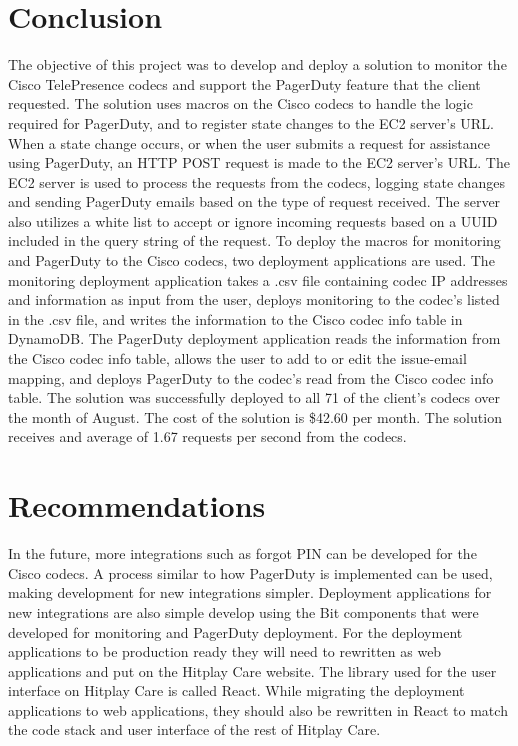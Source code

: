 \documentclass[letterpaper,12pt]{article}
\begin{document}
\section{Conclusion}
The objective of this project was to develop and deploy a solution to monitor the Cisco TelePresence codecs and support the PagerDuty feature that the client requested. The solution uses macros on the Cisco codecs to handle the logic required for PagerDuty, and to register state changes to the EC2 server's URL. When a state change occurs, or when the user submits a request for assistance using PagerDuty, an HTTP POST request is made to the EC2 server's URL. The EC2 server is used to process the requests from the codecs, logging state changes and sending PagerDuty emails based on the type of request received. The server also utilizes a white list to accept or ignore incoming requests based on a UUID included in the query string of the request. To deploy the macros for monitoring and PagerDuty to the Cisco codecs, two deployment applications are used. The monitoring deployment application takes a .csv file containing codec IP addresses and information as input from the user, deploys monitoring to the codec's listed in the .csv file, and writes the information to the Cisco codec info table in DynamoDB. The PagerDuty deployment application reads the information from the Cisco codec info table, allows the user to add to or edit the issue-email mapping, and deploys PagerDuty to the codec's read from the Cisco codec info table. The solution was successfully deployed to all 71 of the client's codecs over the month of August. The cost of the solution is \$42.60 per month. The solution receives and average of 1.67 requests per second from the codecs.

\section{Recommendations}
In the future, more integrations such as forgot PIN can be developed for the Cisco codecs. A process similar to how PagerDuty is implemented can be used, making development for new integrations simpler. Deployment applications for new integrations are also simple develop using the Bit components that were developed for monitoring and PagerDuty deployment. For the deployment applications to be production ready they will need to rewritten as web applications and put on the Hitplay Care website. The library used for the user interface on Hitplay Care is called React. While migrating the deployment applications to web applications, they should also be rewritten in React to match the code stack and user interface of the rest of Hitplay Care.
\pagebreak
\end{document}
